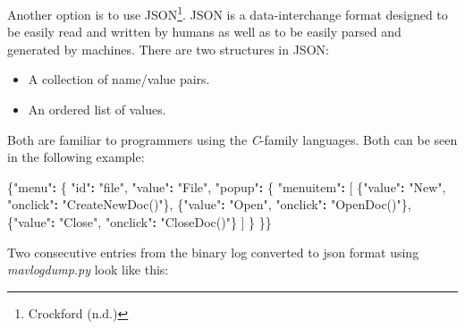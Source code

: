 \documentclass[12pt,oneside]{reedthesis}
\newenvironment{Shaded}{\begin{snugshade}}{\end{snugshade}}
\newcommand{\StringTok}[1]{\textcolor[rgb]{0.31,0.60,0.02}{#1}}
\newcommand{\OperatorTok}[1]{\textcolor[rgb]{0.81,0.36,0.00}{\textbf{#1}}}
\newcommand{\NormalTok}[1]{#1}
\theoremstyle{definition}
\theoremstyle{definition}
\theoremstyle{definition}
\theoremstyle{remark}
\begin{document}
Another option is to use JSON\footnote{Crockford (n.d.)}. JSON is a
data-interchange format designed to be easily read and written by humans
as well as to be easily parsed and generated by machines. There are two
structures in JSON:
\begin{itemize}
\item
  A collection of name/value pairs.
\item
  An ordered list of values.
\end{itemize}
Both are familiar to programmers using the \emph{C}-family languages.
Both can be seen in the following example:
\begin{Shaded}
\begin{Highlighting}[]
\NormalTok{\{}\StringTok{"menu"}\OperatorTok{:}\StringTok{ }\NormalTok{\{}
  \StringTok{"id"}\OperatorTok{:}\StringTok{ "file"}\NormalTok{,}
  \StringTok{"value"}\OperatorTok{:}\StringTok{ "File"}\NormalTok{,}
  \StringTok{"popup"}\OperatorTok{:}\StringTok{ }\NormalTok{\{}
    \StringTok{"menuitem"}\OperatorTok{:}\StringTok{ }\NormalTok{[}
\NormalTok{      \{}\StringTok{"value"}\OperatorTok{:}\StringTok{ "New"}\NormalTok{, }\StringTok{"onclick"}\OperatorTok{:}\StringTok{ "CreateNewDoc()"}\NormalTok{\},}
\NormalTok{      \{}\StringTok{"value"}\OperatorTok{:}\StringTok{ "Open"}\NormalTok{, }\StringTok{"onclick"}\OperatorTok{:}\StringTok{ "OpenDoc()"}\NormalTok{\},}
\NormalTok{      \{}\StringTok{"value"}\OperatorTok{:}\StringTok{ "Close"}\NormalTok{, }\StringTok{"onclick"}\OperatorTok{:}\StringTok{ "CloseDoc()"}\NormalTok{\}}
\NormalTok{    ]}
\NormalTok{  \}}
\NormalTok{\}\}}
\end{Highlighting}
\end{Shaded}
Two consecutive entries from the binary log converted to json format
using \emph{mavlogdump.py} look like this:
\end{document}
